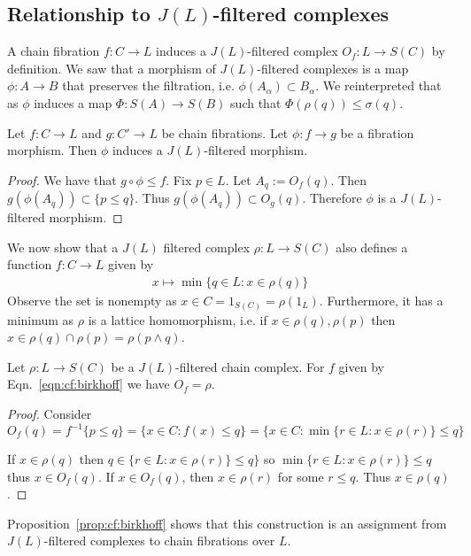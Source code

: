 \subsection{Relationship to $J(L)$-filtered complexes}

A chain fibration $f:C\to L$ induces a $J(L)$-filtered complex $O_f:L\to S(C)$ by definition. We saw that a morphism of $J(L)$-filtered complexes is a map $\phi:A\to B$ that preserves the filtration, i.e. $\phi(A_\alpha)\subset B_\alpha$.  We reinterpreted that as $\phi$ induces a map $\Phi:S(A)\to S(B)$ such that $\Phi(\rho(q))\leq \sigma(q)$.



\begin{prop}
Let $f:C\to L$ and $g:C'\to L$ be chain fibrations.  Let $\phi:f\to g$ be a fibration morphism.  Then $\phi$ induces a $J(L)$-filtered morphism.
\end{prop}
\begin{proof}
We have that $g\circ\phi \leq f$.  Fix $p\in L$.  Let $A_q := O_f(q)$.  Then $g(\phi(A_q))\subset \{p\leq q\}$.  Thus $g(\phi(A_q))\subset O_g(q)$.  Therefore $\phi$ is a $J(L)$-filtered morphism.  
\end{proof}


We now show that a $J(L)$ filtered complex $\rho:L\to S(C)$ also defines a function $f:C\to L$ given by 
\begin{align}\label{eqn:cf:birkhoff}
x\mapsto \min\{q\in L:x\in \rho(q)\}
\end{align}
Observe the set is nonempty as $x\in C=1_{S(C)}=\rho(1_L)$.  Furthermore, it has a minimum as $\rho$ is a lattice homomorphism, i.e. if $x\in \rho(q),\rho(p)$ then $x\in \rho(q)\cap \rho(p)=\rho(p\wedge q)$.  

\begin{prop}\label{prop:cf:birkhoff}
Let $\rho:L\to S(C)$ be a $J(L)$-filtered chain complex.  For $f$ given by Eqn.~\ref{eqn:cf:birkhoff} we have $O_f = \rho$. 
\end{prop}
\begin{proof}
 Consider $$ O_f(q) = f^{-1}\{p\leq q\} = \{x\in C:f(x)\leq q\} = \{x\in C: \min\{r\in L: x\in \rho(r)\}\leq q\} $$

If $x\in \rho(q)$ then $q\in \{r\in L:x\in \rho(r)\}\leq q\}$ so $ \min \{r\in L:x\in \rho(r)\}\leq q$ thus $x\in O_f(q)$.  If $x\in O_f(q)$, then $x\in \rho(r)$ for some $r\leq q$.  Thus $x\in \rho(q)$.  
\end{proof}

Proposition~\ref{prop:cf:birkhoff} shows that this construction is an assignment from $J(L)$-filtered complexes to chain fibrations over $L$.   



